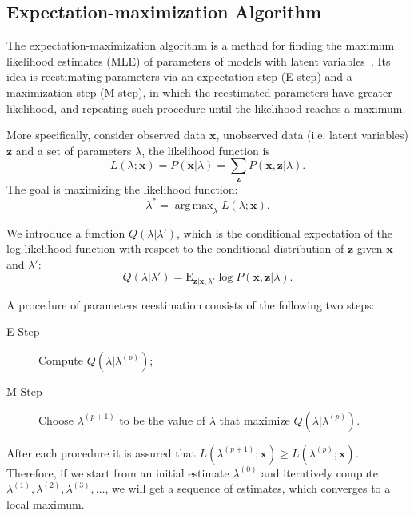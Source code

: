 \documentclass[12pt,final,twoside]{report}
\theoremstyle{plain}
\theoremstyle{definition}
\theoremstyle{remark}
\DeclareMathOperator*{\argmax}{arg\,max}
\begin{document}
\subsection{Expectation-maximization Algorithm}
The expectation-maximization algorithm is a method for finding the maximum likelihood estimates (MLE) of parameters of models with latent variables~\cite{dempster_maximum_1977}. Its idea is reestimating parameters via an expectation step (E-step) and a maximization step (M-step), in which the reestimated parameters have greater likelihood, and repeating such procedure until the likelihood reaches a maximum.

More specifically, consider observed data $\mathbf{x}$, unobserved data (i.e. latent variables) $\mathbf{z}$ and a set of parameters $\lambda$, the likelihood function is
\begin{equation}
  L(\lambda;\mathbf{x}) = P(\mathbf{x}|\lambda) = \sum_{\mathbf{z}} P(\mathbf{x},\mathbf{z}|\lambda) .
\end{equation}
The goal is maximizing the likelihood function:
\begin{equation}
  \lambda^* = \argmax_\lambda L(\lambda;\mathbf{x}).
\end{equation}

We introduce a function $Q(\lambda|\lambda')$, which is the conditional expectation of the log likelihood function with respect to the conditional distribution of $\mathbf{z}$ given $\mathbf{x}$ and $\lambda'$:
\begin{equation}
  Q(\lambda|\lambda') = \text{E}_{\mathbf{z}|\mathbf{x},\lambda'} \log P(\mathbf{x},\mathbf{z}|\lambda) .
\end{equation}

A procedure of parameters reestimation consists of the following two steps:
\begin{description}
  \item[E-Step] Compute $Q(\lambda|\lambda^{(p)})$;
  \item[M-Step] Choose $\lambda^{(p+1)}$ to be the value of $\lambda$ that maximize $Q(\lambda|\lambda^{(p)})$.
\end{description}

After each procedure it is assured that $L(\lambda^{(p+1)};\mathbf{x}) \geq L(\lambda^{(p)};\mathbf{x})$. Therefore, if we start from an initial estimate $\lambda^{(0)}$ and iteratively compute $\lambda^{(1)},\lambda^{(2)},\lambda^{(3)},\dots$, we will get a sequence of estimates, which converges to a local maximum.
\end{document}
